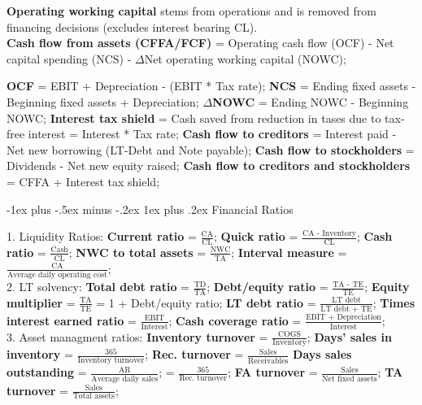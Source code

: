 \documentclass[10pt,landscape]{article}
\makeatletter
\renewcommand{\subsubsection}{\@startsection{subsubsection}{3}{0mm}%
                                {-1ex plus -.5ex minus -.2ex}%
                                {1ex plus .2ex}%
                                {\normalfont\small\bfseries}}
\makeatother
\begin{document}
\begin{multicols}{3}
\textbf{Operating working capital} stems from operations and is removed
from financing decisions (excludes interest bearing CL). \\

\textbf{Cash flow from assets (CFFA/FCF)} = Operating cash flow (OCF)
- Net capital spending (NCS) - $\Delta$Net operating working capital
(NOWC);

\textbf{OCF} = EBIT + Depreciation - (EBIT * Tax rate);
\textbf{NCS} = Ending fixed assets - Beginning fixed assets + Depreciation;
$\Delta$\textbf{NOWC} = Ending NOWC - Beginning NOWC;
\textbf{Interest tax shield} = Cash saved from reduction in tases due to
tax-free interest = Interest * Tax rate;
\textbf{Cash flow to creditors} = Interest paid - Net new borrowing (LT-Debt
and Note payable);
\textbf{Cash flow to stockholders} = Dividends - Net new equity raised;
\textbf{Cash flow to creditors and stockholders} = CFFA + Interest tax shield;

\subsubsection{Financial Ratios}

1. Liquidity Ratios: 
\textbf{Current ratio} = $\frac{\text{CA}}{\text{CL}}$;
\textbf{Quick ratio} = $\frac{\text{CA - Inventory}}{\text{CL}}$;
\textbf{Cash ratio} = $\frac{\text{Cash}}{\text{CL}}$;
\textbf{NWC to total assets} = $\frac{\text{NWC}}{\text{TA}}$;
\textbf{Interval measure} = $\frac{\text{CA}}{\text{Average daily operating cost}}$;
\\

2. LT solvency: 
\textbf{Total debt ratio} = $\frac{\text{TD}}{\text{TA}}$;
\textbf{Debt/equity ratio} = $\frac{\text{TA - TE}}{\text{TE}}$;
\textbf{Equity multiplier} = $\frac{\text{TA}}{\text{TE}}$
= 1 + Debt/equity ratio;
\textbf{LT debt ratio} = $\frac{\text{LT debt}}{\text{LT debt + TE}}$;
\textbf{Times interest earned ratio} = $\frac{\text{EBIT}}{\text{Interest}}$;
\textbf{Cash coverage ratio} = $\frac{\text{EBIT + Depreciation}}
{\text{Interest}}$;
\\

3. Asset managment ratios: 
\textbf{Inventory turnover} = $\frac{\text{COGS}}{\text{Inventory}}$;
\textbf{Days' sales in inventory} = $\frac{\text{365}}{\text{Inventory turnover}}$;
\textbf{Rec. turnover} = $\frac{\text{Sales}}{\text{Receivables}}$
\textbf{Days sales outstanding} = $\frac{\text{AR}}{\text{Average daily sales}}$;
= $\frac{\text{365}}{\text{Rec. turnover}}$;
\textbf{FA turnover} = $\frac{\text{Sales}}{\text{Net fixed assets}}$;
\textbf{TA turnover} = $\frac{\text{Sales}}{\text{Total assets}}$;
\\


\end{multicols}
\end{document}
